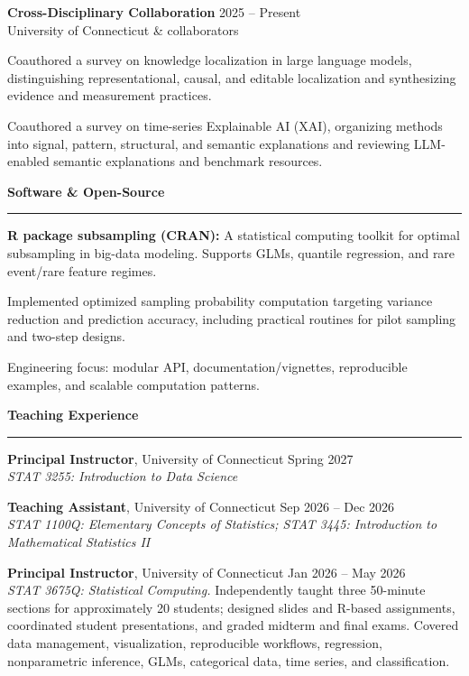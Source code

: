 \documentclass[a4paper,10pt]{article}
\newcommand{\resheading}[1]{
  \vspace{4pt}
  \noindent\textbf{\large #1}\par
  \vspace{2pt}
  \hrule
  \vspace{4pt}
}
\newenvironment{reslist}[1][0pt]{%
  \begin{list}{}{%
    \setlength{\leftmargin}{0pt}%
    \setlength{\rightmargin}{0pt}%
    \setlength{\labelwidth}{0pt}%
    \setlength{\labelsep}{0pt}%
    \setlength{\itemindent}{0pt}%
    \setlength{\listparindent}{0pt}%
    \setlength{\itemsep}{#1}%
    \setlength{\topsep}{0pt}%
    \setlength{\parsep}{0pt}%
    \setlength{\partopsep}{0pt}%
  }%
}{\end{list}}
\newenvironment{bulletlist}[1][0pt]{%
  \begin{list}{\textbullet}{%
    \setlength{\leftmargin}{14pt}%
    \setlength{\rightmargin}{0pt}%
    \setlength{\labelwidth}{8pt}%
    \setlength{\labelsep}{6pt}%
    \setlength{\itemindent}{0pt}%
    \setlength{\listparindent}{0pt}%
    \setlength{\itemsep}{#1}%
    \setlength{\topsep}{2pt}%
    \setlength{\parsep}{0pt}%
    \setlength{\partopsep}{0pt}%
  }%
}{\end{list}}
\begin{document}
\begin{reslist}[1pt]
  \newpage
  \item \textbf{Cross-Disciplinary Collaboration} \hfill 2025 -- Present \\
  University of Connecticut \& collaborators
  \begin{bulletlist}[0pt]
    \item Coauthored a survey on knowledge localization in large language models, distinguishing representational, causal, and editable localization and synthesizing evidence and measurement practices.
    \item Coauthored a survey on time-series Explainable AI (XAI), organizing methods into signal, pattern, structural, and semantic explanations and reviewing LLM-enabled semantic explanations and benchmark resources.
  \end{bulletlist}

\end{reslist}

\resheading{Software \& Open-Source}
\begin{reslist}[1pt]
  \item \textbf{R package subsampling (CRAN):} A statistical computing toolkit for optimal subsampling in big-data modeling. Supports GLMs, quantile regression, and rare event/rare feature regimes.
  \begin{bulletlist}[0pt]
    \item Implemented optimized sampling probability computation targeting variance reduction and prediction accuracy, including practical routines for pilot sampling and two-step designs.
    \item Engineering focus: modular API, documentation/vignettes, reproducible examples, and scalable computation patterns.
  \end{bulletlist}
\end{reslist}

\resheading{Teaching Experience}
\begin{reslist}[1pt]
  \item \textbf{Principal Instructor}, University of Connecticut \hfill Spring 2027 \\
  \textit{STAT 3255: Introduction to Data Science}
  \item \textbf{Teaching Assistant}, University of Connecticut \hfill Sep 2026 -- Dec 2026 \\
  \textit{STAT 1100Q: Elementary Concepts of Statistics; STAT 3445: Introduction to Mathematical Statistics II}
  \item \textbf{Principal Instructor}, University of Connecticut \hfill Jan 2026 -- May 2026 \\
  \textit{STAT 3675Q: Statistical Computing.} Independently taught three 50-minute sections for approximately 20 students; designed slides and R-based assignments, coordinated student presentations, and graded midterm and final exams. Covered data management, visualization, reproducible workflows, regression, nonparametric inference, GLMs, categorical data, time series, and classification.
\end{reslist}
\end{document}
